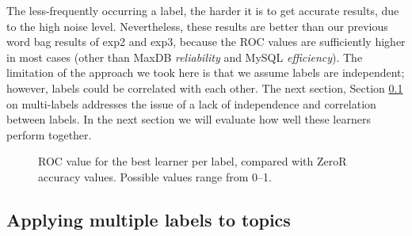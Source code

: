 \documentclass[]{sig-alternate}
\begin{document}
The less-frequently occurring a label, the harder it is to get accurate
results, due to the high noise level. Nevertheless, these results are
better than our previous word bag results of \textsf{exp2} and
\textsf{exp3}, because the ROC values are sufficiently higher in most
cases (other than MaxDB \emph{reliability} and MySQL \emph{efficiency}). The
limitation of the approach we took here is that we assume labels are
independent; however, labels could be correlated with each other. 
The next section, Section \ref{sec:multilabel} on multi-labels
addresses the issue of a lack of independence and correlation between labels.
In the next section we will evaluate how well these learners perform
together.

\begin{figure}[ht]
\centering
{}
\caption[]{ROC value for the best learner per label, compared with ZeroR accuracy values.  Possible values range from 0--1.
}
\label{fig:best-learn-per-tag}
\end{figure}

\subsection{Applying multiple labels to topics}
\label{sec:multilabel}
\end{document}

